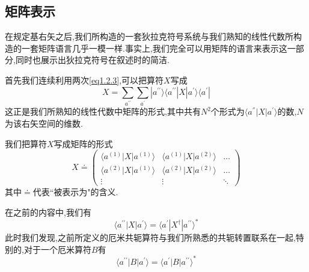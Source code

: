 \documentclass[lang=cn,newtx,10pt,scheme=chinese,thmcnt=section]{elegantbook}
\begin{document}
\subsection*{矩阵表示}
在规定基右矢之后,我们所构造的一套狄拉克符号系统与我们熟知的线性代数所构造的一套矩阵语言几乎一模一样.事实上,我们完全可以用矩阵的语言来表示这一部分,同时也展示出狄拉克符号在叙述时的简洁.

首先我们连续利用两次\ref{eq1.2.3},可以把算符$X$写成
\begin{equation}
X=\sum_{a^{\prime\prime}}\sum_{a^{\prime}}|a^{\prime\prime}\rangle\langle a^{\prime\prime}|X|a^{\prime}\rangle\langle a^{\prime}|
\end{equation}
这正是我们所熟知的线性代数中矩阵的形式,其中共有$N^2$个形式为$\langle a^{''}|X|a^{'}\rangle$的数,$N$为该右矢空间的维数.

我们把算符$X$写成矩阵的形式
\begin{equation}
	X\doteq
	\begin{pmatrix}
		\langle a^{(1)}| X| a^{(1)}\rangle&\langle a^{(1)}| X| a^{(2)}\rangle&\ldots\\
		\langle a^{(2)}| X| a^{(1)}\rangle&\langle a^{(2)}| X| a^{(2)}\rangle&\ldots\\
		\vdots&\vdots&\ddots
	\end{pmatrix}
\end{equation}
其中$\doteq$代表``被表示为"的含义.

在之前的内容中,我们有
$$\langle a^{\prime\prime}| X| a^{\prime}\rangle=\langle a^{\prime}| X^\dagger| a^{\prime\prime}\rangle^*$$
此时我们发现,之前所定义的厄米共轭算符与我们所熟悉的共轭转置联系在一起,特别的,对于一个厄米算符$B$有
\begin{equation}
	\langle a^{\prime\prime}|B| a^{\prime}\rangle=\langle a^{\prime}| B| a^{\prime\prime}\rangle^*
\end{equation}
\end{document}
